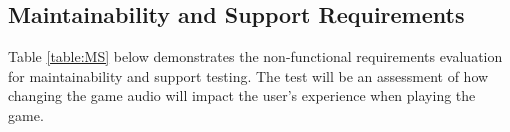 \documentclass[12pt, titlepage]{article}
\begin{document}
\subsection{Maintainability and Support Requirements}
Table \ref{table:MS}  below demonstrates the non-functional requirements evaluation for maintainability and support testing. The test will be an assessment of how changing the game audio will impact the user's experience when playing the game.
\begin{table}[H]
\caption{\bf Non-Functional Requirements Evaluation Results for Maintainability and Support Requirements\\}
\label{table:MS}
\end{table}
\end{document}
